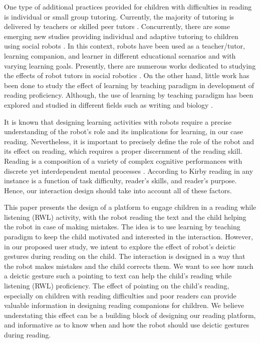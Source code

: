 \documentclass{sigchi}
\begin{document}
One type of additional practices provided for children with difficulties in reading is individual or small group tutoring. 
Currently, the majority of tutoring is delivered by teachers or skilled peer tutors \cite{wood1976role,goodlad1989peer,wenger2014artificial}. 
Concurrently, there are some emerging new studies providing individual and adaptive tutoring to children using social robots \cite{belpaeme2015l2tor,leyzberg2014personalizing,brown2013engaging}.
%
In this context, robots have been used as a teacher/tutor, learning companion, and learner in different educational scenarios and with varying learning goals.
Presently, there are numerous works dedicated to studying the effects of robot tutors in social robotics \cite{kanda2004interactive, castellano2009detecting,ribeiro2014m,kennedy2015robot}.
On the other hand, little work has been done to study the effect of learning by teaching paradigm in development of reading proficiency. 
Although, the use of learning by teaching paradigm has been explored and studied in different fields such as writing and biology \cite{hood2015children,chase2009teachable}.

It is known that designing learning activities with robots require a precise understanding of the robot's role and its implications for learning, in our case reading.
Nevertheless, it is important to precisely define the role of the robot and its effect on reading, which requires a proper discernment of the reading skill. 
Reading is a composition of a variety of complex cognitive performances with discrete yet interdependent mental processes \cite{kirby1988style}.  
According to Kirby \cite{kirby1988style} reading in any instance is a function of task difficulty, reader's skills, and reader's purpose. 
Hence,  our interaction design should take into account all of these factors.  


This paper presents the design of a platform to engage children in a reading while listening (RWL) activity, with the robot reading the text and the child helping the robot in case of making mistakes.
The idea is to use learning by teaching paradigm to keep the child motivated and interested in the interaction.
However, in our proposed user study, we intent to explore the effect of robot's deictic gestures during reading on the child. 
The interaction is designed in a way that the robot makes mistakes and the child corrects them.
We want to see how much a deictic gesture such a pointing to text can help the child's reading while listening (RWL) proficiency. 
The effect of pointing on the child's reading, especially on children with reading difficulties and poor readers can provide valuable information in designing reading companions for children. 
We believe understating this effect can be a building block of designing our reading platform, and informative as to know when and how the robot should use deictic gestures during reading. 
\end{document}
